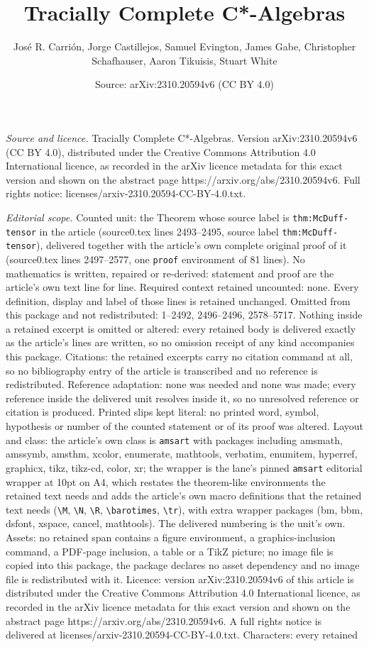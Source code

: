 \documentclass[10pt,a4paper]{amsart}
\title[Tracially Complete C*-Algebras]{Tracially Complete C*-Algebras}
\author{Jos\'e R. Carri\'on, Jorge Castillejos, Samuel Evington, James Gabe, Christopher Schafhauser, Aaron Tikuisis, Stuart White}
\date{Source: arXiv:2310.20594v6 (CC BY 4.0)}
\begin{document}
\maketitle

\noindent\emph{Source and licence.} Tracially Complete C*-Algebras. Version arXiv:2310.20594v6 (CC BY 4.0), distributed under the Creative Commons Attribution 4.0 International licence, as recorded in the arXiv licence metadata for this exact version and shown on the abstract page https://arxiv.org/abs/2310.20594v6. Full rights notice: licenses/arxiv-2310.20594-CC-BY-4.0.txt.\par\smallskip

\noindent\textit{Editorial scope.} Counted unit: the Theorem whose source label is \texttt{thm:McDuff-tensor} in the article (source0.tex lines 2493--2495, source label \texttt{thm:McDuff-tensor}), delivered together with the article's own complete original proof of it (source0.tex lines 2497--2577, one \texttt{proof} environment of 81 lines). No mathematics is written, repaired or re-derived: statement and proof are the article's own text line for line. Required context retained uncounted: none. Every definition, display and label of those lines is retained unchanged. Omitted from this package and not redistributed: 1--2492, 2496--2496, 2578--5717. Nothing inside a retained excerpt is omitted or altered: every retained body is delivered exactly as the article's lines are written, so no omission receipt of any kind accompanies this package. Citations: the retained excerpts carry no citation command at all, so no bibliography entry of the article is transcribed and no reference is redistributed. Reference adaptation: none was needed and none was made; every reference inside the delivered unit resolves inside it, so no unresolved reference or citation is produced. Printed slips kept literal: no printed word, symbol, hypothesis or number of the counted statement or of its proof was altered. Layout and class: the article's own class is \texttt{amsart} with packages including amsmath, amssymb, amsthm, xcolor, enumerate, mathtools, verbatim, enumitem, hyperref, graphicx, tikz, tikz-cd, color, xr; the wrapper is the lane's pinned \texttt{amsart} editorial wrapper at 10pt on A4, which restates the theorem-like environments the retained text needs and adds the article's own macro definitions that the retained text needs (\texttt{\textbackslash M}, \texttt{\textbackslash N}, \texttt{\textbackslash R}, \texttt{\textbackslash barotimes}, \texttt{\textbackslash tr}), with extra wrapper packages (bm, bbm, dsfont, xspace, cancel, mathtools). The delivered numbering is the unit's own. Assets: no retained span contains a figure environment, a graphics-inclusion command, a PDF-page inclusion, a table or a TikZ picture; no image file is copied into this package, the package declares no asset dependency and no image file is redistributed with it. Licence: version arXiv:2310.20594v6 of this article is distributed under the Creative Commons Attribution 4.0 International licence, as recorded in the arXiv licence metadata for this exact version and shown on the abstract page https://arxiv.org/abs/2310.20594v6. A full rights notice is delivered at licenses/arxiv-2310.20594-CC-BY-4.0.txt. Characters: every retained 
\end{document}
